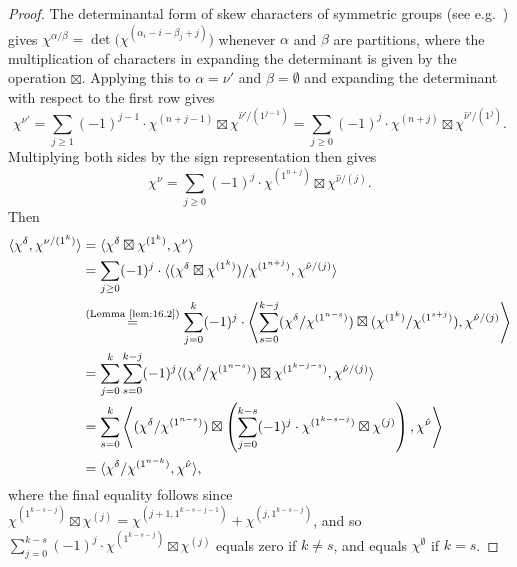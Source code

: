 \begin{proof}
	The determinantal form of skew characters of symmetric groups (see e.g.~\cite[2.3.13]{JK}) gives $\chi^{\alpha/\beta} = \det\big(\chi^{(\alpha_i-i-\beta_j+j)}\big)$ whenever $\alpha$ and $\beta$ are partitions, where the multiplication of characters in expanding the determinant is given by the operation $\boxtimes$. Applying this to $\alpha=\nu'$ and $\beta=\emptyset$ and expanding the determinant with respect to the first row gives
	\[ \chi^{\nu'} = \sum_{j\ge 1} (-1)^{j-1}\cdot \chi^{(n+j-1)}\boxtimes \chi^{\hat{\nu}'/(1^{j-1})} = \sum_{j\ge 0} (-1)^j\cdot\chi^{(n+j)}\boxtimes \chi^{\hat{\nu}'/(1^j)}. \]
	Multiplying both sides by the sign representation then gives
	\[ \chi^\nu = \sum_{j\ge 0} (-1)^j\cdot \chi^{(1^{n+j})}\boxtimes \chi^{\hat{\nu}/(j)}. \]
	Then
	\begin{align*}
		\langle\chi^\delta,\chi^{\nu/(1^k)}\rangle &= \langle \chi^\delta\boxtimes\chi^{(1^k)},\chi^\nu\rangle \\
		&= \sum_{j\ge 0}(-1)^j\cdot\langle(\chi^\delta\boxtimes\chi^{(1^k)})/\chi^{(1^{n+j})}, \chi^{\hat{\nu}/(j)} \rangle\\
		&\overset{\normalfont\tiny \text{(Lemma~\ref{lem:16.2})}}{=} \sum_{j=0}^k (-1)^j\cdot \left\langle \sum_{s=0}^{k-j}(\chi^\delta/\chi^{(1^{n-s})})\boxtimes(\chi^{(1^k)}/\chi^{(1^{s+j})}), \chi^{\hat{\nu}/(j)}\right\rangle\\
		&=\sum_{j=0}^k \sum_{s=0}^{k-j}(-1)^j \langle (\chi^\delta/\chi^{(1^{n-s})})\boxtimes \chi^{(1^{k-j-s})}, \chi^{\hat{\nu}/(j)}\rangle\\
		&= \sum_{s=0}^k \left\langle (\chi^\delta/\chi^{(1^{n-s})})\boxtimes \left(\sum_{j=0}^{k-s}(-1)^j\cdot\chi^{(1^{k-s-j})}\boxtimes\chi^{(j)}\right), \chi^{\hat{\nu}}\right\rangle\\
		&=\langle \chi^\delta/\chi^{(1^{n-k})}, \chi^{\hat{\nu}}\rangle,
	\end{align*}
	where the final equality follows since $\chi^{(1^{k-s-j})}\boxtimes\chi^{(j)}=\chi^{(j+1,1^{k-s-j-1})}+\chi^{(j,1^{k-s-j})}$, and so $\sum_{j=0}^{k-s}(-1)^j\cdot\chi^{(1^{k-s-j})}\boxtimes\chi^{(j)}$ equals zero if $k\ne s$, and equals $\chi^\emptyset$ if $k=s$.
\end{proof}
